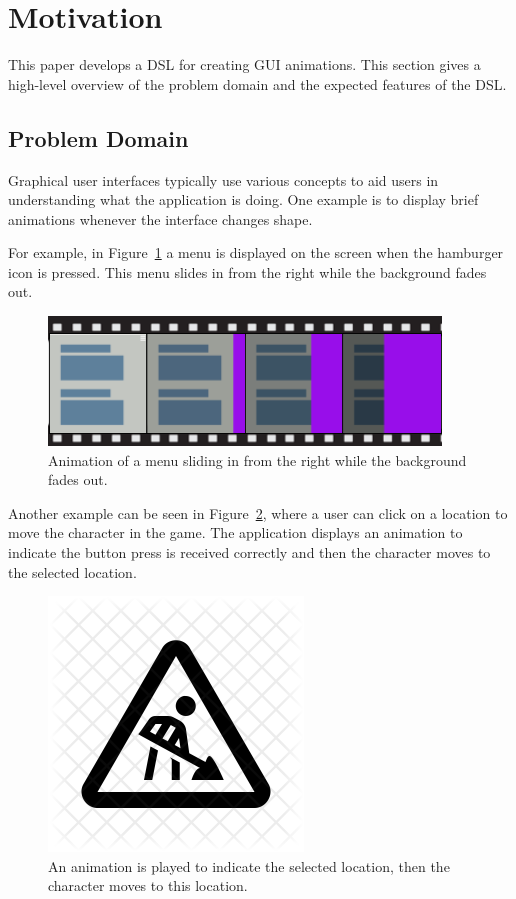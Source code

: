 \section{Motivation}
\label{sec:motivation}

This paper develops a DSL for creating GUI animations. This section gives a high-level overview of the problem domain and the expected features of the DSL.

\subsection{Problem Domain}

Graphical user interfaces typically use various concepts to aid users in understanding what the application is doing. One example is to display brief animations whenever the interface changes shape.

For example, in Figure~\ref{fig:usecase1} a menu is displayed on the screen when the hamburger icon is pressed. This menu slides in from the right while the background fades out.

\begin{figure}[H]
\centering
\includegraphics[scale=0.4]{pictures/usecase1fig.png}
\caption{Animation of a menu sliding in from the right while the background fades out.}
\label{fig:usecase1}
\end{figure}

Another example can be seen in Figure~\ref{fig:usecase2}, where a user can click on a location to move the character in the game. The application displays an animation to indicate the button press is received correctly and then the character moves to the selected location.

\begin{figure}[H]
\centering
\includegraphics[scale=0.4]{pictures/todo.png}
\caption{An animation is played to indicate the selected location, then the character moves to this location.}
\label{fig:usecase2}
\end{figure}

